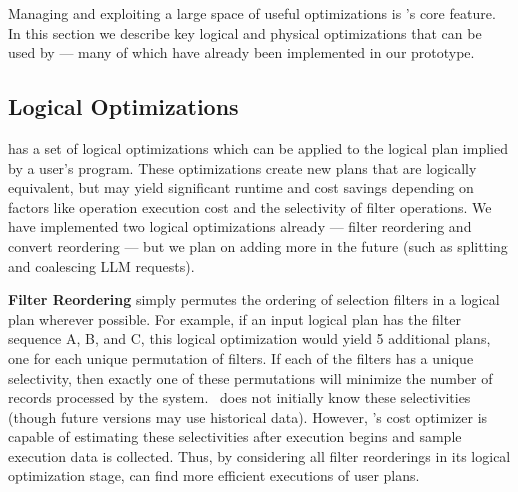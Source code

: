 Managing and exploiting a large space of useful optimizations is \system's core feature. In this section we describe key logical and physical optimizations that can be used by \system{} --- many of which have already been implemented in our prototype. %

\subsection{Logical Optimizations}
\label{sec:logical_opt}
\system{} has a set of logical optimizations which can be applied to the logical plan implied by a user's program. These optimizations create new plans that are logically equivalent, but may yield significant runtime and cost savings depending on factors like operation execution cost and the selectivity of filter operations.  We have implemented two logical optimizations already --- filter reordering and convert reordering --- but we plan on adding more in the future (such as splitting and coalescing LLM requests).

{\bf Filter Reordering} simply permutes the ordering of selection filters in a logical plan wherever possible. For example, if an input logical plan has the filter sequence A, B, and C, this logical optimization would yield 5 additional plans, one for each unique permutation of filters. If each of the filters has a unique selectivity, then exactly one of these permutations will minimize the number of records processed by the system. \system\ does not initially know these selectivities (though future versions may use historical data). However, \system{}'s cost optimizer is capable of estimating these selectivities after execution begins and sample execution data is collected. Thus, by considering all filter reorderings in its logical optimization stage, \system{} can find more efficient executions of user plans. 


    
